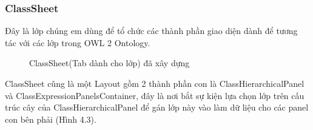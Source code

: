 \subsubsection{ClassSheet}
Đây là lớp chúng em dùng để tổ chức các thành phần giao diện dành để tương tác với các lớp trong OWL 2 Ontology.
\begin{figure}[h!]
	\centering
	\caption{ClassSheet(Tab dành cho lớp) đã xây dựng\label{overflow}}
\end{figure}
{\let\thefootnote\relax{}}
ClassSheet cũng là một Layout gồm 2 thành phần con là ClassHierarchicalPanel và ClassExpressionPanelsContainer, đây là nơi bắt sự kiện lựa chọn lớp trên cấu trúc cây của ClassHierarchicalPanel để gán lớp này vào làm dữ liệu cho các panel con bên phải (Hình 4.3).
